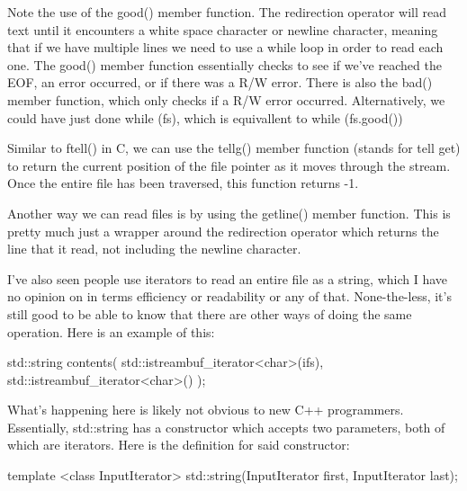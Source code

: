 \documentclass{article}
\begin{document}
Note the use of the good() member function. The redirection operator will read text until it encounters a
white space character or newline character, meaning that if we have multiple lines we need to use a while
loop in order to read each one. The good() member function essentially checks to see if we’ve reached the
EOF, an error occurred, or if there was a R/W error. There is also the bad() member function, which only
checks if a R/W error occurred. Alternatively, we could have just done while (fs), which is equivallent to
while (fs.good())

Similar to ftell() in C, we can use the tellg() member function (stands for tell get) to return the current
position of the file pointer as it moves through the stream. Once the entire file has been traversed, this
function returns -1.

Another way we can read files is by using the getline() member function. This is pretty much just a wrapper
around the redirection operator which returns the line that it read, not including the newline character.

I’ve also seen people use iterators to read an entire file as a string, which I have no opinion on in terms
efficiency or readability or any of that. None-the-less, it’s still good to be able to know that there are
other ways of doing the same operation. Here is an example of this:

\begin{cpplst}

std::string contents(
    std::istreambuf_iterator<char>(ifs),
    std::istreambuf_iterator<char>()
);

\end{cpplst}

What's happening here is likely not obvious to new C++ programmers. Essentially, std::string has a
constructor which accepts two parameters, both of which are iterators. Here is the definition for said
constructor:

\begin{cpplst}

template <class InputIterator>
std::string(InputIterator first, InputIterator last);

\end{cpplst}
\end{document}
